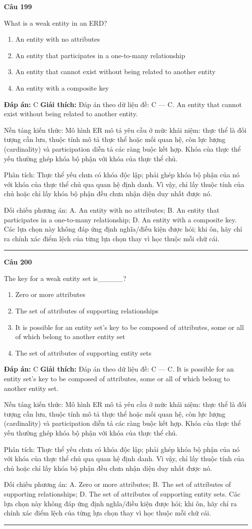 \documentclass[11pt,a4paper]{article}
\newenvironment{question}[1]{%
  \par\vspace{1em}\noindent\textbf{\large Câu #1}\par\vspace{0.4em}
}{%
  \par\vspace{1em}\hrule\vspace{0.6em}
}
\newenvironment{choices}{%
  \begin{enumerate}[label=\textbf{\Alph*.},leftmargin=2.2em,itemsep=2pt,topsep=3pt]
}{%
  \end{enumerate}
}
\newcommand{\choice}{\item}
\begin{document}
\begin{question}{199}
What is a weak entity in an ERD?
\begin{choices}
\choice An entity with no attributes
\choice An entity that participates in a one-to-many relationship
\choice An entity that cannot exist without being related to another entity
\choice An entity with a composite key
\end{choices}
\textbf{Đáp án:} C
\textbf{Giải thích:} Đáp án theo dữ liệu đề: C — C. An entity that cannot exist without being related to another entity.

Nền tảng kiến thức: Mô hình ER mô tả yêu cầu ở mức khái niệm: thực thể là đối tượng cần lưu, thuộc tính mô tả thực thể hoặc mối quan hệ, còn lực lượng (cardinality) và participation diễn tả các ràng buộc kết hợp. Khóa của thực thể yếu thường ghép khóa bộ phận với khóa của thực thể chủ.

Phân tích: Thực thể yếu chưa có khóa độc lập; phải ghép khóa bộ phận của nó với khóa của thực thể chủ qua quan hệ định danh. Vì vậy, chỉ lấy thuộc tính của chủ hoặc chỉ lấy khóa bộ phận đều chưa nhận diện duy nhất được nó.

Đối chiếu phương án: A. An entity with no attributes; B. An entity that participates in a one-to-many relationship; D. An entity with a composite key. Các lựa chọn này không đáp ứng định nghĩa/điều kiện được hỏi; khi ôn, hãy chỉ ra chính xác điểm lệch của từng lựa chọn thay vì học thuộc mỗi chữ cái.
\end{question}

\begin{question}{200}
The key for a weak entity set is_____?
\begin{choices}
\choice Zero or more attributes
\choice The set of attributes of supporting relationships
\choice It is possible for an entity set's key to be composed of attributes, some or all of which belong to another entity set
\choice The set of attributes of supporting entity sets
\end{choices}
\textbf{Đáp án:} C
\textbf{Giải thích:} Đáp án theo dữ liệu đề: C — C. It is possible for an entity set's key to be composed of attributes, some or all of which belong to another entity set.

Nền tảng kiến thức: Mô hình ER mô tả yêu cầu ở mức khái niệm: thực thể là đối tượng cần lưu, thuộc tính mô tả thực thể hoặc mối quan hệ, còn lực lượng (cardinality) và participation diễn tả các ràng buộc kết hợp. Khóa của thực thể yếu thường ghép khóa bộ phận với khóa của thực thể chủ.

Phân tích: Thực thể yếu chưa có khóa độc lập; phải ghép khóa bộ phận của nó với khóa của thực thể chủ qua quan hệ định danh. Vì vậy, chỉ lấy thuộc tính của chủ hoặc chỉ lấy khóa bộ phận đều chưa nhận diện duy nhất được nó.

Đối chiếu phương án: A. Zero or more attributes; B. The set of attributes of supporting relationships; D. The set of attributes of supporting entity sets. Các lựa chọn này không đáp ứng định nghĩa/điều kiện được hỏi; khi ôn, hãy chỉ ra chính xác điểm lệch của từng lựa chọn thay vì học thuộc mỗi chữ cái.
\end{question}
\end{document}
